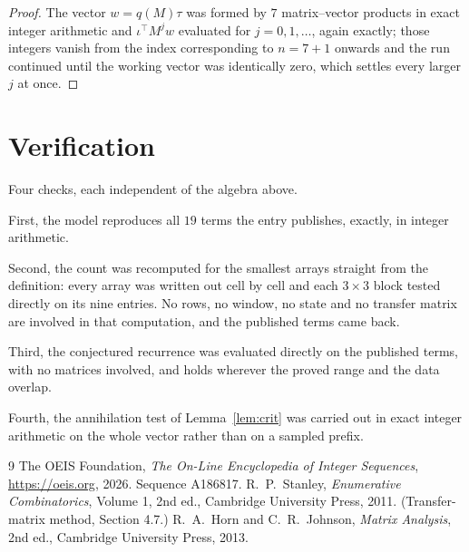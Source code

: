 \documentclass[11pt,a4paper]{article}
\theoremstyle{plain}
\theoremstyle{definition}
\begin{document}
\begin{proof}
The vector $w=q(M)\tau$ was formed by $7$ matrix--vector products in exact integer
arithmetic and $\iota^{\!\top}M^{j}w$ evaluated for $j=0,1,\dots$, again exactly; those
integers vanish from the index corresponding to $n=7+1$ onwards and the run continued
until the working vector was identically zero, which settles every larger $j$ at once.
\end{proof}

\section{Verification}

Four checks, each independent of the algebra above.

First, the model reproduces all $19$ terms the entry publishes, exactly, in integer
arithmetic.

Second, the count was recomputed for the smallest arrays straight from the definition: every
array was written out cell by cell and each $3\times3$ block tested directly on its nine
entries. No rows, no window, no state and no transfer matrix are involved in that computation,
and the published terms came back.

Third, the conjectured recurrence was evaluated directly on the published terms, with no
matrices involved, and holds wherever the proved range and the data overlap.

Fourth, the annihilation test of Lemma~\ref{lem:crit} was carried out in exact integer
arithmetic on the whole vector rather than on a sampled prefix.

\begin{thebibliography}{9}
 The OEIS Foundation, \emph{The On-Line Encyclopedia of Integer
Sequences}, \url{https://oeis.org}, 2026. Sequence A186817.
 R.~P.~Stanley, \emph{Enumerative Combinatorics}, Volume 1, 2nd ed.,
Cambridge University Press, 2011. (Transfer-matrix method, Section 4.7.)
 R.~A.~Horn and C.~R.~Johnson, \emph{Matrix Analysis}, 2nd ed., Cambridge
University Press, 2013.
\end{thebibliography}
\end{document}
